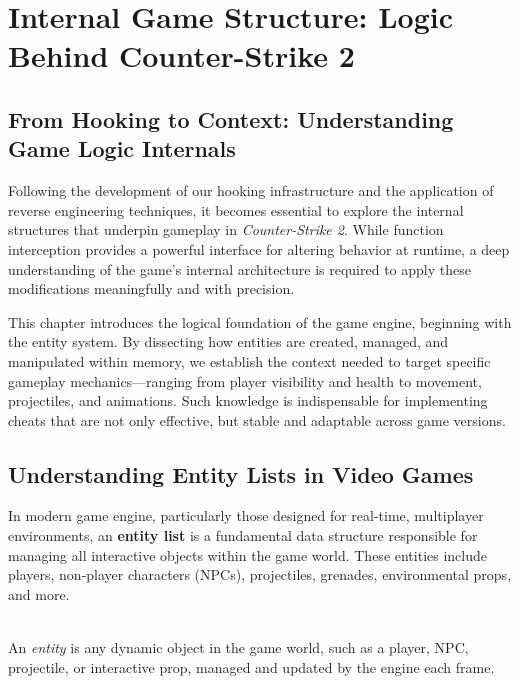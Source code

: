\chapter{Internal Game Structure: Logic Behind Counter-Strike 2}

\section*{From Hooking to Context: Understanding Game Logic Internals}

Following the development of our hooking infrastructure and the application of reverse engineering techniques, it becomes essential to explore the internal structures that underpin gameplay in \textit{Counter-Strike 2}.  
While function interception provides a powerful interface for altering behavior at runtime, a deep understanding of the game’s internal architecture is required to apply these modifications meaningfully and with precision.

This chapter introduces the logical foundation of the game engine, beginning with the entity system.  
By dissecting how entities are created, managed, and manipulated within memory, we establish the context needed to target specific gameplay mechanics—ranging from player visibility and health to movement, projectiles, and animations.  
Such knowledge is indispensable for implementing cheats that are not only effective, but stable and adaptable across game versions.

\section{Understanding Entity Lists in Video Games}

In modern game engine, particularly those designed for real-time, multiplayer environments, an \textbf{entity list} is a fundamental data structure responsible for managing all interactive objects within the game world. These entities include players, non-player characters (NPCs), projectiles, grenades, environmental props, and more.

\begin{tcolorbox}[colback=gray!10, colframe=gray!50, sharp corners, boxrule=0pt]
 \\
An \textit{entity} is any dynamic object in the game world, such as a player, NPC, projectile, or interactive prop, managed and updated by the engine each frame.
\end{tcolorbox}

